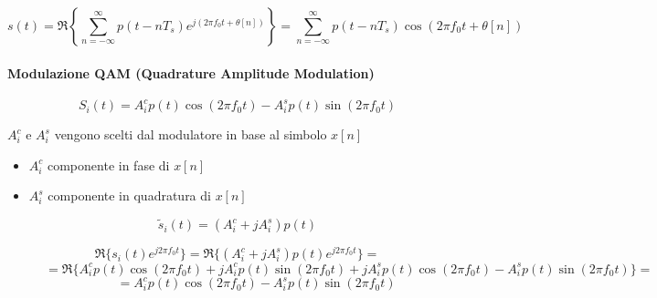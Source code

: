 \begin{equation*}
    s(t) = \Re \left\{ \sum_{n=-\infty}^{\infty} p(t-nT_s) e^{j (2\pi f_0 t + \theta[n])} \right\}  = \sum_{n=-\infty}^{\infty} p(t-nT_s) \cos(2\pi f_0 t + \theta[n])
\end{equation*}


\begin{center}


\end{center}

\paragraph*{Modulazione QAM (Quadrature Amplitude Modulation)}


\begin{equation*}
    S_i(t) = A_i^c p(t) \cos(2\pi f_0 t) - A_i^s p(t) \sin(2\pi f_0 t)
\end{equation*}

$A_i^c$ e $A_i^s$ vengono scelti dal modulatore in base al simbolo $x[n]$
\begin{itemize}
    \item $A_i^c$ componente in fase di $x[n]$
    \item $A_i^s$ componente in quadratura di $x[n]$
\end{itemize}


\[
    \tilde{s}_i(t) = (A_i^c + j A_i^s) p(t)   
\]

\[
    \Re\{s_i(t) e^{j2\pi f_0 t}\} = \Re\{(A_i^c + j A_i^s) p(t) e^{j2\pi f_0 t}\} =
\]
\[
    \phantom{TODO} = \Re\{A_i^c p(t) \cos(2\pi f_0 t) + j A_i^c p(t) \sin(2\pi f_0 t) + j A_i^s p(t) \cos(2\pi f_0 t) - A_i^s p(t) \sin(2\pi f_0 t)\} =
\]
\[
    \phantom{TODO} = A_i^c p(t) \cos(2\pi f_0 t) - A_i^s p(t) \sin(2\pi f_0 t)    
\]

